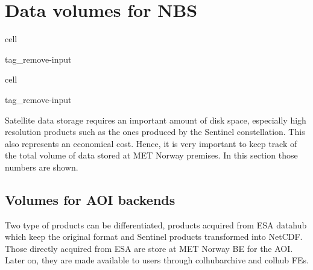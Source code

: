 \documentclass[letterpaper,10pt,english]{jupyterBook}
\begin{document}
\chapter{Data volumes for NBS}
\label{\detokenize{volumes:data-volumes-for-nbs}}\label{\detokenize{volumes::doc}}
\begin{sphinxuseclass}{cell}
\begin{sphinxuseclass}{tag_remove-input}
\end{sphinxuseclass}
\end{sphinxuseclass}
\begin{sphinxuseclass}{cell}
\begin{sphinxuseclass}{tag_remove-input}
\end{sphinxuseclass}
\end{sphinxuseclass}
\sphinxAtStartPar
Satellite data storage requires an important amount of disk space, especially high resolution products such as the ones produced by the Sentinel constellation. This also represents an economical cost. Hence, it is very important to keep track of the total volume of data stored at MET Norway premises. In this section those numbers are shown.


\section{Volumes for AOI backends}
\label{\detokenize{volumes:volumes-for-aoi-backends}}
\sphinxAtStartPar
Two type of products can be differentiated, products acquired from ESA datahub which keep the original format and Sentinel products transformed into NetCDF. Those directly acquired from ESA are store at MET Norway BE for the AOI. Later on, they are made available to users through colhub\sphinxhyphen{}archive and colhub FEs.
\end{document}
